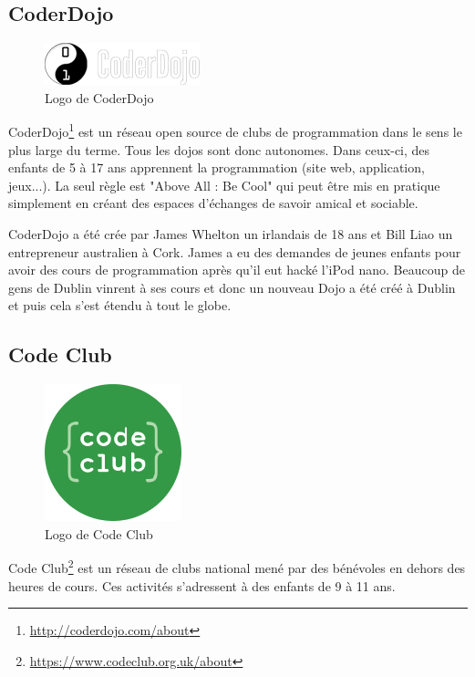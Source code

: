 \subsection{CoderDojo}
\begin{figure}[!h]
  \begin{center}
    \includegraphics[scale=0.5]{content/5-related_work/images/dojo}
    \caption{Logo de CoderDojo}
    \label{fig:coder dojo}
  \end{center}
\end{figure}
CoderDojo\footnote{\url{http://coderdojo.com/about}} est un réseau open source de clubs de programmation dans le sens le plus large du terme. Tous les dojos sont donc autonomes. Dans ceux-ci, des enfants de 5 à 17 ans apprennent la programmation (site web, application, jeux...). La seul règle est "Above All : Be Cool" qui peut être mis en pratique simplement en créant des espaces d'échanges de savoir amical et sociable.

CoderDojo a été crée par James Whelton un irlandais de 18 ans et Bill Liao un entrepreneur australien à Cork. James a eu des demandes de jeunes enfants pour avoir des cours de programmation après qu'il eut hacké l'iPod nano. Beaucoup de gens de Dublin vinrent à ses cours et donc un nouveau Dojo a été créé à Dublin et puis cela s'est étendu à tout le globe.

\subsection{Code Club}
\begin{figure}[!h]
  \begin{center}
    \includegraphics[scale=0.3]{content/5-related_work/images/club}
    \caption{Logo de Code Club}
    \label{fig:code club}
  \end{center}
\end{figure}
Code Club\footnote{\url{https://www.codeclub.org.uk/about}} est un réseau de clubs national mené par des bénévoles en dehors des heures de cours. Ces activités s'adressent à des enfants de 9 à 11 ans.

